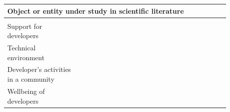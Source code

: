 \documentclass[english, 12pt, a4paper, sci, utf8, a-1b, online]{aaltothesis}
\begin{document}
\renewcommand{\arraystretch}{1.5}
\begin{center}
  \begin{longtable}{p{0.3\linewidth}p{0.6\linewidth}}
    \multicolumn{2}{l}{\textbf{Object or entity under study in scientific literature}}                                                                                                                                                                                                                                                                                                                     \\
    \hline                                                                                                                                                                                                                                                                                                                                             \\
    Support for developers                     & \textcite{fontao2017investigating} \newline \textcite{fontao2016mseco} \newline \textcite{fontao2018mobile}                                                                                                                                                                                           \\
    Technical environment                      & \textcite{flow-intrinsic-dx} \newline \textcite{kuusinen2016software} \newline \textcite{programmer-experience}                                                                                                                                                                                       \\
    Developer's activities in a community      & \textcite{fontao2015research} \newline \textcite{design-framework-enhancing} \newline \textcite{oran2017set} \newline \textcite{open-service-innovation} \newline \textcite{claussen2019role}                                                                                                        \\
    Wellbeing of developers                    & \textcite{what-happens-when-unhappy} \newline  \textcite{consequences-of-unhappiness} \newline \textcite{fontao2017facing} \newline \textcite{unhappy-developers} \newline \textcite{on-the-unhappiness}                                                                                              \\

\end{longtable}
\end{center}
\end{document}
